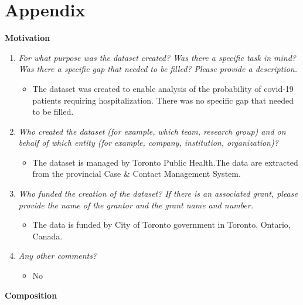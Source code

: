 \documentclass[
]{article}
\providecommand{\tightlist}{%
  \setlength{\itemsep}{0pt}\setlength{\parskip}{0pt}}
\begin{document}
\newpage

\hypertarget{appendix}{%
\section{Appendix}\label{appendix}}

\textbf{Motivation}

\begin{enumerate}
\def\labelenumi{\arabic{enumi}.}
\tightlist
\item
  \emph{For what purpose was the dataset created? Was there a specific task in mind? Was there a specific gap that needed to be filled? Please provide a description.}

  \begin{itemize}
  \tightlist
  \item
    The dataset was created to enable analysis of the probability of covid-19 patients requiring hospitalization. There was no specific gap that needed to be filled.
  \end{itemize}
\item
  \emph{Who created the dataset (for example, which team, research group) and on behalf of which entity (for example, company, institution, organization)?}

  \begin{itemize}
  \tightlist
  \item
    The dataset is managed by Toronto Public Health.The data are extracted from the provincial Case \& Contact Management System.
  \end{itemize}
\item
  \emph{Who funded the creation of the dataset? If there is an associated grant, please provide the name of the grantor and the grant name and number.}

  \begin{itemize}
  \tightlist
  \item
    The data is funded by City of Toronto government in Toronto, Ontario, Canada.
  \end{itemize}
\item
  \emph{Any other comments?}

  \begin{itemize}
  \tightlist
  \item
    No
  \end{itemize}
\end{enumerate}

\textbf{Composition}
\end{document}
